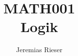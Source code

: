 \documentclass[a4paper]{report}
\author{Jeremias Rieser}
\title{MATH001\\Logik}
\begin{document}
\maketitle

\begin{abstract}
	
\end{abstract}

\newpage

\tableofcontents


\newpage

    

\appendix
\appendixpage



\newpage

\printbibliography
\end{document}
